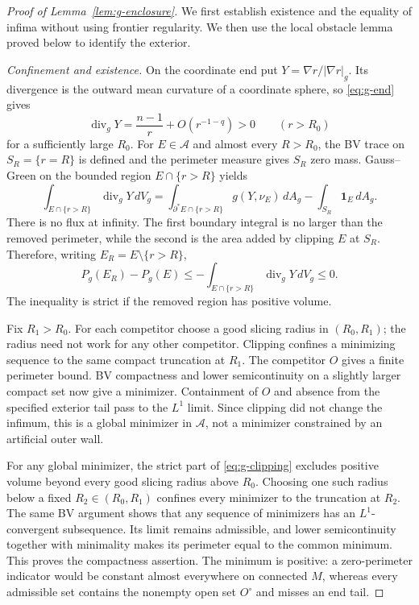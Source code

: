 \begin{proof}[Proof of Lemma~\ref{lem:g-enclosure}]
We first establish existence and the equality of infima without using
frontier regularity.  We then use the local obstacle lemma proved
below to identify the exterior.

\emph{Confinement and existence.}
On the coordinate end put $Y=\nabla r/|\nabla r|_g$.  Its divergence is
the outward mean curvature of a coordinate sphere, so
\eqref{eq:g-end} gives
\begin{equation}
 \operatorname{div}_gY=\frac{n-1}{r}+O(r^{-1-q})>0
 \qquad(r>R_0)
 \label{eq:g-outer-divergence}
\end{equation}
for a sufficiently large $R_0$.  For $E\in\mathcal A$ and almost every
$R>R_0$, the BV trace on $S_R=\{r=R\}$ is defined and the perimeter
measure gives $S_R$ zero mass.  Gauss--Green on the bounded region
$E\cap\{r>R\}$ yields
\[
 \int_{E\cap\{r>R\}}\operatorname{div}_gY\,dV_g
 =\int_{\partial^*E\cap\{r>R\}}g(Y,\nu_E)\,dA_g
   -\int_{S_R}\mathbf1_E\,dA_g.
\]
There is no flux at infinity.  The first boundary integral is no
larger than the removed perimeter, while the second is the area added
by clipping $E$ at $S_R$.  Therefore, writing $E_R=E\setminus\{r>R\}$,
\begin{equation}
 P_g(E_R)-P_g(E)
 \le-\int_{E\cap\{r>R\}}\operatorname{div}_gY\,dV_g\le0.
 \label{eq:g-clipping}
\end{equation}
The inequality is strict if the removed region has positive volume.

Fix $R_1>R_0$.  For each competitor choose a good slicing radius in
$(R_0,R_1)$; the radius need not work for any other competitor.
Clipping confines a minimizing sequence to the same compact
truncation at $R_1$.  The competitor $O$ gives a finite perimeter
bound.  BV compactness and lower semicontinuity on a slightly larger
compact set now give a minimizer.  Containment of $O$ and absence from
the specified exterior tail pass to the $L^1$ limit.  Since clipping
did not change the infimum, this is a global minimizer in
$\mathcal A$, not a minimizer constrained by an artificial outer wall.

For any global minimizer, the strict part of \eqref{eq:g-clipping}
excludes positive volume beyond every good slicing radius above
$R_0$.  Choosing one such radius below a fixed
$R_2\in(R_0,R_1)$ confines every minimizer to the truncation at $R_2$.
The same BV argument shows that any sequence of minimizers has an
$L^1$-convergent subsequence.  Its limit remains admissible, and lower
semicontinuity together with minimality makes its perimeter equal to
the common minimum.  This proves the compactness assertion.  The
minimum is positive: a zero-perimeter indicator would be constant
almost everywhere on connected $M$, whereas every admissible set
contains the nonempty open set $O^\circ$ and misses an end tail.


\end{proof}
